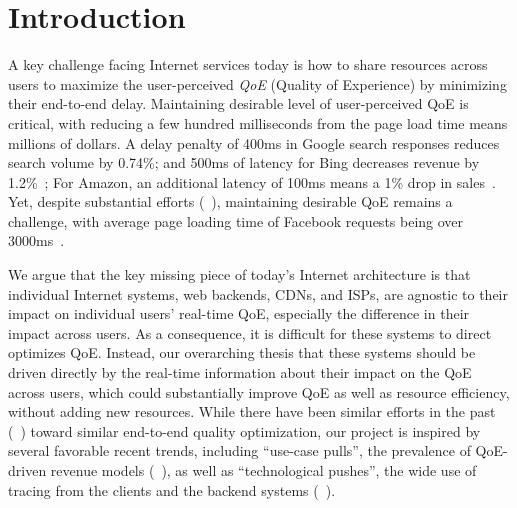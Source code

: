 
\section{Introduction}

\noindent A key challenge facing Internet services today is how to share resources across users to maximize the user-perceived {\em QoE} (Quality of Experience) by minimizing their end-to-end delay.
Maintaining desirable level of user-perceived QoE is critical, with reducing a few hundred milliseconds from the page load time means millions of dollars.
A delay penalty of 400ms in Google search responses reduces search volume by 0.74\%; and 500ms of latency for Bing decreases revenue by 1.2\%~\cite{google-revenue,bing-revenue}; For Amazon, an additional latency of 100ms means a 1\% drop in sales~\cite{amazon-revenue}.
Yet, despite substantial efforts (\eg~\cite{shandian,gaze,rosen2017push,jalaparti2013speeding}), maintaining desirable QoE remains a challenge, with average page loading time of Facebook requests being over 3000ms~\cite{mystery}.

We argue that the key missing piece of today's Internet architecture is that individual Internet systems, \eg web backends, CDNs, and ISPs, are agnostic to their impact on individual users' real-time QoE, especially the difference in their impact across users.
As a consequence, it is difficult for these systems to direct optimizes QoE. 
Instead, our overarching thesis that these systems should be driven directly by the real-time information about their impact on the QoE across users, which could substantially improve QoE as well as resource efficiency, without adding new resources.
While there have been similar efforts in the past (\eg~\cite{alto,frank2013pushing,xie2008p4p,jiang2009cooperative}) toward similar end-to-end quality optimization, our project is inspired by several favorable recent trends, including ``use-case pulls'', \eg the prevalence of QoE-driven revenue models (\eg~\cite{akamai-report,dobrian2011understanding}), as well as ``technological pushes'', \eg the wide use of tracing from the clients and the backend systems (\eg~\cite{mystery,zhao2014lprof}). 

